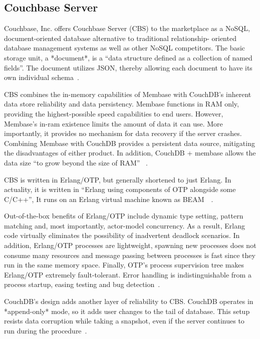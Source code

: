      \pv

\subsection{Couchbase Server}


Couchbase, Inc. offers Couchbase Server (CBS) to the marketplace as a
NoSQL, document-oriented database alternative to traditional
relationship- oriented database management systems as well as other
NoSQL competitors.  The basic storage unit, a *document*, is a ``data
structure defined as a collection of named fields''.  The document
utilizes JSON, thereby allowing each document to have its own
individual schema~\cite{www-infoworld-cbs}.

CBS combines the in-memory capabilities of Membase with CouchDB's
inherent data store reliability and data persistency.  Membase
functions in RAM only, providing the highest-possible speed
capabilities to end users.  However, Membase's in-ram existence limits
the amount of data it can use.  More importantly, it provides no
mechanism for data recovery if the server crashes.  Combining Membase
with CouchDB provides a persistent data source, mitigating the
disadvantages of either product.  In addition, CouchDB + membase
allows the data size ``to grow beyond the size of RAM''
~\cite{www-safaribooks-cbs}.

CBS is written in Erlang/OTP, but generally shortened to just Erlang.
In actuality, it is written in ``Erlang using components of OTP
alongside some C/C++'', It runs on an Erlang virtual machine known as
BEAM~\cite{www-wikipedia-erlang-cbs}~\cite{www-erlangcentral-cbs}.

Out-of-the-box benefits of Erlang/OTP include dynamic type setting,
pattern matching and, most importantly, actor-model concurrency.  As a
result, Erlang code virtually eliminates the possibility of
inadvertent deadlock scenarios.  In addition, Erlang/OTP processes are
lightweight, spawning new processes does not consume many resources
and message passing between processes is fast since they run in the
same memory space.  Finally, OTP's process supervision tree makes
Erlang/OTP extremely fault-tolerant.  Error handling is
indistinguishable from a process startup, easing testing and bug
detection~\cite{www-couchbase-blog-cbs}.

CouchDB's design adds another layer of reliability to CBS.  CouchDB
operates in *append-only* mode, so it adds user changes to the tail of
database.  This setup resists data corruption while taking a snapshot,
even if the server continues to run during the
procedure~\cite{www-hightower-cbs}.

